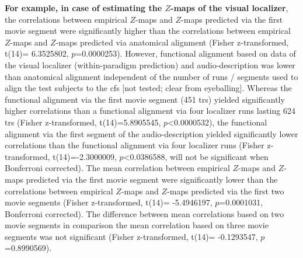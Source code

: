 %
\textbf{For example, in case of estimating the $Z$-maps of the visual
localizer}, the correlations between empirical $Z$-maps and $Z$-maps predicted
via the first movie segment were significantly higher than the correlations
between empirical $Z$-maps and $Z$-maps predicted via anatomical alignment
(Fisher z-transformed, t(14)= 6.3525802, $p$=0.0000253).
%
However, functional alignment based on data of the visual localizer
(within-paradigm prediction) and audio-description was lower than anatomical
alignment independent of the number of runs / segments used to align the test
subjects to the \ac{cfs} [not tested; clear from eyeballing].
%
Whereas the functional alignment via the first movie segment (451 \acp{tr})
yielded significantly higher correlations than a functional alignment via four
localizer runs lasting 624 \acp{tr} (Fisher z-transformed, t(14)=5.8905545,
$p$<0.0000532),
%
the functional alignment via the first segment of the audio-description yielded
significantly lower correlations than the functional alignment via four
localizer runs (Fisher z-transformed, t(14)=-2.3000009, $p$<0.0386588, will not
be significant when Bonferroni corrected).
%
The mean correlation between empirical $Z$-maps and $Z$-maps predicted via the
first movie segment were significantly lower than the correlations between
empirical $Z$-maps and $Z$-maps predicted via the first two movie segments
(Fisher z-transformed, t(14)= -5.4946197, $p$=0.0001031, Bonferroni corrected).
%
The difference between mean correlations based on two movie segments in
comparison the mean correlation based on three movie segments was not
significant (Fisher z-transformed, t(14)= -0.1293547, $p$=0.8990569).


